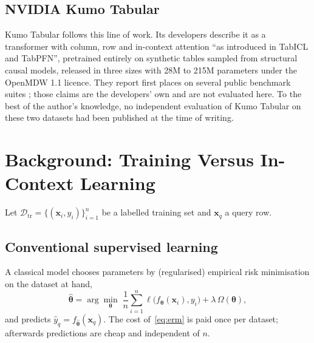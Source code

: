 \documentclass{ieeeaccess}
\begin{document}
\subsection{NVIDIA Kumo Tabular}
Kumo Tabular \cite{nvidia_kumo_card,nvidia_kumo_blog} follows this line of work. Its developers describe it as a transformer with column, row and in-context attention ``as introduced in TabICL and TabPFN'', pretrained entirely on synthetic tables sampled from structural causal models, released in three sizes with 28M to 215M parameters under the OpenMDW 1.1 licence. They report first places on several public benchmark suites \cite{nvidia_kumo_blog}; those claims are the developers' own and are not evaluated here. To the best of the author's knowledge, no independent evaluation of Kumo Tabular on these two datasets had been published at the time of writing.

\section{Background: Training Versus In-Context Learning}
\label{sec:background}

Let $\mathcal{D}_{\mathrm{tr}}=\{(\mathbf{x}_i,y_i)\}_{i=1}^{n}$ be a labelled training set and $\mathbf{x}_q$ a query row.

\subsection{Conventional supervised learning}
A classical model chooses parameters by (regularised) empirical risk minimisation on the dataset at hand,
\begin{equation}
\hat{\boldsymbol\theta}=\arg\min_{\boldsymbol\theta}\;\frac{1}{n}\sum_{i=1}^{n}\ell\big(f_{\boldsymbol\theta}(\mathbf{x}_i),y_i\big)+\lambda\,\Omega(\boldsymbol\theta),
\label{eq:erm}
\end{equation}
and predicts $\hat{y}_q=f_{\hat{\boldsymbol\theta}}(\mathbf{x}_q)$. The cost of~\eqref{eq:erm} is paid once per dataset; afterwards predictions are cheap and independent of $n$.
\end{document}
